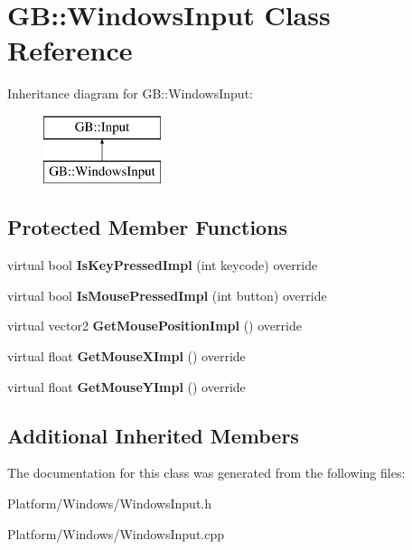 \hypertarget{class_g_b_1_1_windows_input}{}\section{GB\+::Windows\+Input Class Reference}
\label{class_g_b_1_1_windows_input}
Inheritance diagram for GB\+::Windows\+Input\+:\begin{figure}[H]
\begin{center}
\leavevmode
\includegraphics[height=2.000000cm]{class_g_b_1_1_windows_input}
\end{center}
\end{figure}
\subsection*{Protected Member Functions}
\begin{DoxyCompactItemize}
\item 
\mbox{\label{class_g_b_1_1_windows_input_a80dca22d8e80db45042dda4dbf0110b3}} 
virtual bool {\bfseries Is\+Key\+Pressed\+Impl} (int keycode) override
\item 
\mbox{\label{class_g_b_1_1_windows_input_a059963e9fd6aff4fd352b2c518fa47db}} 
virtual bool {\bfseries Is\+Mouse\+Pressed\+Impl} (int button) override
\item 
\mbox{\label{class_g_b_1_1_windows_input_aba08551ea3ee26579dd64fb32f0c40ac}} 
virtual vector2 {\bfseries Get\+Mouse\+Position\+Impl} () override
\item 
\mbox{\label{class_g_b_1_1_windows_input_ab105a6b53f0c282acff4da33880c3276}} 
virtual float {\bfseries Get\+Mouse\+X\+Impl} () override
\item 
\mbox{\label{class_g_b_1_1_windows_input_aa7a6a951306dad581f1e4c66d8909165}} 
virtual float {\bfseries Get\+Mouse\+Y\+Impl} () override
\end{DoxyCompactItemize}
\subsection*{Additional Inherited Members}


The documentation for this class was generated from the following files\+:\begin{DoxyCompactItemize}
\item 
Platform/\+Windows/Windows\+Input.\+h\item 
Platform/\+Windows/Windows\+Input.\+cpp\end{DoxyCompactItemize}
